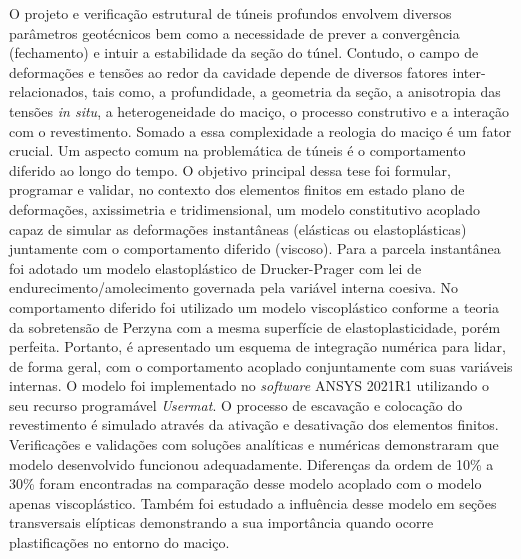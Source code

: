 O projeto e verificação estrutural de túneis profundos envolvem diversos parâmetros geotécnicos bem como a necessidade de prever a convergência (fechamento) e intuir a estabilidade da seção do túnel. Contudo, o campo de deformações e tensões ao redor da cavidade depende de diversos fatores inter-relacionados, tais como, a profundidade, a geometria da seção, a anisotropia das tensões \textit{in situ}, a heterogeneidade do maciço, o processo construtivo e a interação com o revestimento. Somado a essa complexidade a reologia do maciço é um fator crucial. Um aspecto comum na problemática de túneis é o comportamento diferido ao longo do tempo. O objetivo principal dessa tese foi formular, programar e validar, no contexto dos elementos finitos em estado plano de deformações, axissimetria e tridimensional, um modelo constitutivo acoplado capaz de simular as deformações instantâneas (elásticas ou elastoplásticas) juntamente com o comportamento diferido (viscoso). Para a parcela instantânea foi adotado um modelo elastoplástico de Drucker-Prager com lei de endurecimento/amolecimento governada pela variável interna coesiva. No comportamento diferido foi utilizado um modelo viscoplástico conforme a teoria da sobretensão de Perzyna com a mesma superfície de elastoplasticidade, porém perfeita. Portanto, é apresentado um esquema de integração numérica para lidar, de forma geral, com o comportamento acoplado conjuntamente com suas variáveis internas. O modelo foi implementado no \textit{software} ANSYS 2021R1 utilizando o seu recurso programável \textit{Usermat}. O processo de escavação e colocação do revestimento é simulado através da ativação e desativação dos elementos finitos. Verificações e validações com soluções analíticas e numéricas demonstraram que modelo desenvolvido funcionou adequadamente. Diferenças da ordem de 10\% a 30\% foram encontradas na comparação desse modelo acoplado com o modelo apenas viscoplástico. Também foi estudado a influência desse modelo em seções transversais elípticas demonstrando a sua importância quando ocorre plastificações no entorno do maciço.